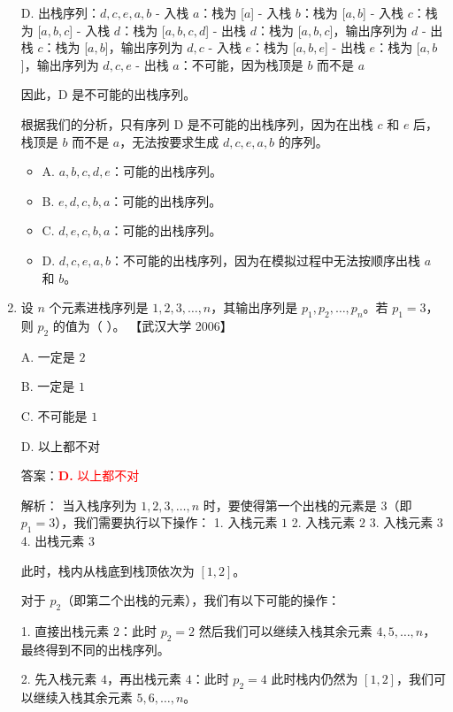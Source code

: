 \documentclass[lang=cn,newtx,10pt,scheme=chinese]{../../../elegantbook}
\begin{document}
\begin{enumerate}
    D. 出栈序列：$d, c, e, a, b$
       - 入栈 $a$：栈为 [$a$]
       - 入栈 $b$：栈为 [$a, b$]
       - 入栈 $c$：栈为 [$a, b, c$]
       - 入栈 $d$：栈为 [$a, b, c, d$]
       - 出栈 $d$：栈为 [$a, b, c$]，输出序列为 $d$
       - 出栈 $c$：栈为 [$a, b$]，输出序列为 $d, c$
       - 入栈 $e$：栈为 [$a, b, e$]
       - 出栈 $e$：栈为 [$a, b$]，输出序列为 $d, c, e$
       - 出栈 $a$：不可能，因为栈顶是 $b$ 而不是 $a$

       因此，D 是不可能的出栈序列。

    根据我们的分析，只有序列 D 是不可能的出栈序列，因为在出栈 $c$ 和 $e$ 后，栈顶是 $b$ 而不是 $a$，无法按要求生成 $d, c, e, a, b$ 的序列。

    \begin{itemize}
        \item A. $a, b, c, d, e$：可能的出栈序列。
        \item B. $e, d, c, b, a$：可能的出栈序列。
        \item C. $d, e, c, b, a$：可能的出栈序列。
        \item D. $d, c, e, a, b$：不可能的出栈序列，因为在模拟过程中无法按顺序出栈 $a$ 和 $b$。
    \end{itemize}

    \item 设 $n$ 个元素进栈序列是 $1, 2, 3, \ldots, n$，其输出序列是 $p_1, p_2, \ldots, p_n$。若 $p_1 = 3$，则 $p_2$ 的值为（ ）。  
    【武汉大学 2006】 

    A. 一定是 $2$  

    B. 一定是 $1$  

    C. 不可能是 $1$  

    D. 以上都不对  

    答案：\textcolor{red}{\textbf{D.} 以上都不对}

    解析：
    当入栈序列为 $1, 2, 3, \ldots, n$ 时，要使得第一个出栈的元素是 $3$（即 $p_1 = 3$），我们需要执行以下操作：
    1. 入栈元素 $1$
    2. 入栈元素 $2$
    3. 入栈元素 $3$
    4. 出栈元素 $3$

    此时，栈内从栈底到栈顶依次为 $[1, 2]$。

    对于 $p_2$（即第二个出栈的元素），我们有以下可能的操作：

    1. 直接出栈元素 $2$：此时 $p_2 = 2$
       然后我们可以继续入栈其余元素 $4, 5, \ldots, n$，最终得到不同的出栈序列。

    2. 先入栈元素 $4$，再出栈元素 $4$：此时 $p_2 = 4$
       此时栈内仍然为 $[1, 2]$，我们可以继续入栈其余元素 $5, 6, \ldots, n$。


\end{enumerate}
\end{document}
